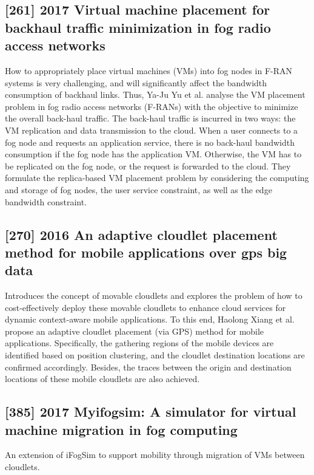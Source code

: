 \subsection{[261] 2017 Virtual machine placement for backhaul traffic minimization in fog radio access networks}
\label{subsec:paper18}
How to appropriately place virtual machines (VMs) into fog nodes in F-RAN systems is very challenging, and will significantly affect the bandwidth consumption of backhaul links. Thus, Ya-Ju Yu et al. \cite{yu2017virtual} analyse the VM placement problem in fog radio access networks (F-RANs) with the objective to minimize the overall back-haul traffic. The back-haul traffic is incurred in two ways: the VM replication and data transmission to the cloud. When a user connects to a fog node and requests an application service, there is no back-haul bandwidth consumption if the fog node has the application VM. Otherwise, the VM has to be replicated on the fog node, or the request is forwarded to the cloud. They formulate the replica-based VM placement problem by considering the computing and storage of fog nodes, the user service constraint, as well as the edge bandwidth constraint.

\subsection{[270] 2016 An adaptive cloudlet placement method for mobile applications over gps big data}
\label{subsec:paper19}
Introduces the concept of movable cloudlets and explores the problem of how to cost-effectively deploy these movable cloudlets to enhance cloud services for dynamic context-aware mobile applications. To this end, Haolong Xiang et al. \cite{xiang2016adaptive} propose an adaptive cloudlet placement (via GPS) method for mobile applications. Specifically, the gathering regions of the mobile devices are identified based on position clustering, and the cloudlet destination locations are confirmed accordingly. Besides, the traces between the origin and destination locations of these mobile cloudlets are also achieved.

\subsection{[385] 2017 Myifogsim: A simulator for virtual machine migration in fog computing}
\label{subsec:paper21} \cite{lopes2017myifogsim}
An extension of iFogSim to support mobility through migration of VMs between cloudlets.

